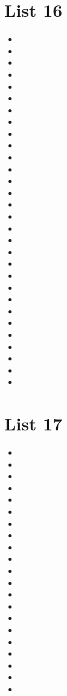 \documentclass[a4paper,10pt]{article}
\begin{document}
\begin{CJK*}{UTF8}{gkai}
\section{List 16}
\begin{itemize}
\item 
\item 
\item 
\item 
\item 
\item 
\item 
\item 
\item 
\item 
\item 
\item 
\item 
\item 
\item 
\item 
\item 
\item 
\item 
\item 
\item 
\item 
\item 
\item 
\item 
\item 
\item 
\item 
\item 
\item 
\end{itemize}

\newpage
\section{List 17}
\begin{itemize}
\item 
\item 
\item 
\item 
\item 
\item 
\item 
\item 
\item 
\item 
\item 
\item 
\item 
\item 
\item 
\item 
\item 
\item 
\item 
\item 
\item 
\end{itemize}


\end{CJK*}
\end{document}
